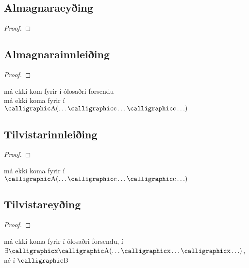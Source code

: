 \begin{multicols}{2}
\subsection*{Almagnaraeyðing}

\begin{proof}
	 
\end{proof}

\subsection*{Almagnarainnleiðing}

\begin{proof}
	 
\end{proof}

\noindent 	{} má ekki kom fyrir í ólosaðri forsendu\\ 
 má ekki koma fyrir í $\meta{A}(\ldots \meta{c} \ldots \meta{c}\ldots)$

\subsection*{Tilvistarinnleiðing}

\begin{proof}
	 
\end{proof}

\noindent {} má ekki koma fyrir í $\meta{A}(\ldots \meta{c} \ldots \meta{c}\ldots)$

\subsection*{Tilvistareyðing}

\begin{proof}
	\open	
	\close
	 
\end{proof}

\noindent {} má ekki koma fyrir í ólosaðri forsendu, í $\exists \meta{x}\meta{A}(\ldots \meta{x} \ldots \meta{x}\ldots)$, né í $\meta{B}$\vfill\columnbreak
\end{multicols}

